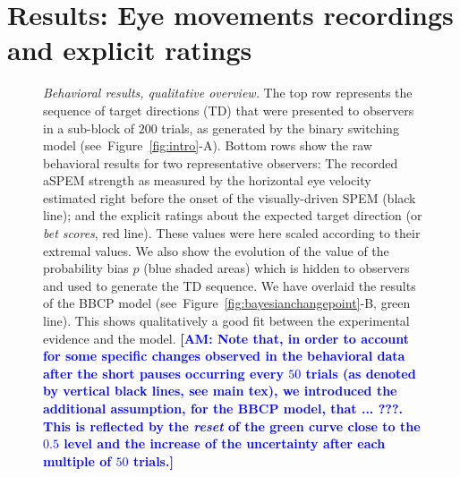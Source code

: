 \documentclass[12pt,english]{article}%
\newcommand{\seeFig}[1]{Figure~\ref{fig:#1}}
\newcommand{\AM}[1]{\textbf{\textcolor{blue}{[AM: #1]}}}
\begin{document}
\section{Results: Eye movements recordings and explicit ratings}
\label{sec:results_psycho}
\begin{figure}%
\caption{
\emph{Behavioral results, qualitative overview.} %
The top row represents the sequence of target directions (TD)
that were presented to observers
in a sub-block of $200$ trials,
as generated by the binary switching model (see~\seeFig{intro}-A).
Bottom rows show the raw behavioral results 
for two representative observers:
The recorded aSPEM strength as measured 
by the horizontal eye velocity estimated right before
the onset of the visually-driven SPEM (black line);
and the explicit ratings about the expected target direction (or \textit{bet scores}, red line).
These values were here scaled according to their extremal values.
We also show the evolution of the value 
of the probability bias $p$ (blue shaded areas)
which is hidden to observers
and used to generate the TD sequence.
We have overlaid the results of the BBCP model 
(see~\seeFig{bayesianchangepoint}-B, green line).
This shows qualitatively a good fit between 
the experimental evidence and the model. 
\AM{Note that, in order to account for some specific changes observed in the behavioral data after the short pauses occurring every $50$ trials (as denoted by vertical black lines, see main tex), we introduced the additional assumption, for the BBCP model, that ... ???. This is reflected by the \textit{reset} of the green curve close to the $0.5$ level and the increase of the uncertainty after each multiple of $50$ trials.}
}
\label{fig:results_psycho}
\end{figure}
\end{document}
